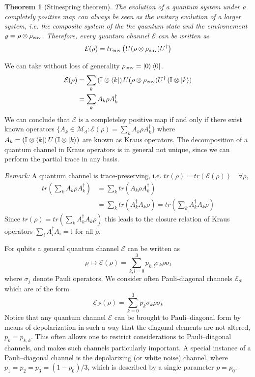 \documentclass[10pt,a4paper]{book}
\numberwithin{equation}{chapter}
\numberwithin{figure}{chapter}
\numberwithin{table}{chapter}
\newtheorem{theorem}{Theorem}[section]
\begin{document}
\begin{theorem}[Stinespring theorem] The evolution of a quantum system under a completely positive map can always be seen as the unitary evolution of a larger system, i.e. the composite system of the the quantum state and the environement $\varrho = \rho \otimes \rho_{\textup{env}}$. Therefore, every quantum channel $\mathcal{E}$ can be written as
\begin{equation}
\mathcal{E}(\rho)= tr_{\textup{env}} \left( U (\rho \otimes \rho_{\textup{env}})U^{\dagger}\right)
\end{equation}
\end{theorem}
We can take without loss of generality $\rho_{\textup{env}}= \ket{0}\bra{0}$. 
\begin{align}
\mathcal{E}(\rho)&= \sum_k \left( \mathbb{I}\otimes \bra{k}\right) U (\rho \otimes \rho_{\textup{env}})U^{\dagger}  \left( \mathbb{I}\otimes \ket{k}\right)\\
&= \sum_k A_k \rho A^{\dagger}_k
\end{align}
We can conclude that $\mathcal{E}$ is a completeley positive map if and only if there exist known operators $\lbrace A_k \in \mathcal{M}_d : \mathcal{E}(\rho)=\sum_k A_k \rho A^{\dagger}_k \rbrace$
where $A_k =\left(\mathbb{I}\otimes \bra{k}\right) U \left(\mathbb{I}\otimes \ket{k}\right)$ are known as Kraus operators. The decomposition of a quantum channel in Kraus operators is in general not unique, since we can perform the partial trace in any basis. 

\textit{Remark:} A quantum channel is trace-preserving, i.e. $tr(\rho)=tr(\mathcal{E}(\rho)) \quad \forall \rho$, 
\begin{align}
tr\left(\sum_k A_k \rho A^{\dagger}_k\right)&= \sum_k tr(A_k \rho A^{\dagger}_k)\\
&=\sum_k tr(A^{\dagger}_k A_k \rho)= tr \left( \sum_k A^{\dagger}_k A_k \rho \right)
\end{align}
Since $tr(\rho)=tr \left( \sum_k A^{\dagger}_k A_k \rho \right)$ this leads to the closure relation of Kraus operators $\sum_i A^{\dagger}_i A_i=\mathbb{I} $ for all $\rho$.

For qubits a general quantum channel $\mathcal{E}$ can be written as
\begin{equation}
\rho \longmapsto \mathcal{E}(\rho) = \sum^{3}_{k,l=0} p_{k,l}\sigma_k \rho \sigma_l
\end{equation}
where $\sigma_j$ denote Pauli operators. We consider often Pauli-diagonal channels $\mathcal{E_P}$ which are of the form
\begin{equation}
\mathcal{E_P}(\rho)= \sum^{3}_{k=0} p_{k}\sigma_k \rho \sigma_k
\end{equation}
Notice that any quantum channel $\mathcal{E}$ can be brought to Pauli–diagonal form by means of depolarization \cite{depolarize} in such a way that the diagonal elements are not altered, $p_k=p_{k,k}$. This often allows one to restrict considerations to Pauli–diagonal channels, and makes such channels particularly important. A special instance of a Pauli–diagonal channel is the depolarizing (or white noise) channel, where $p_1 =p_2 =p_3 = (1-p_0)/3$, which is described by a single parameter $p=p_0$.
\end{document}
